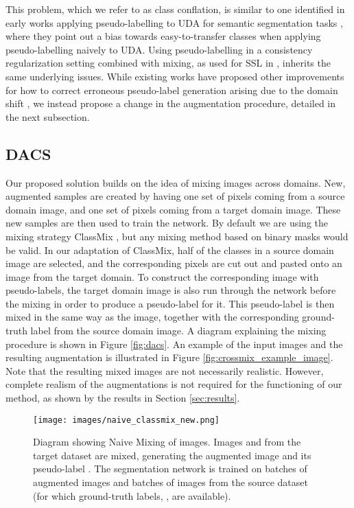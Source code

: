 \documentclass[10pt,twocolumn,letterpaper]{article}
\begin{document}
This problem, which we refer to as class conflation, is similar to one identified in early works applying pseudo-labelling to UDA for semantic segmentation tasks \cite{zou2018domain}, where they point out a bias towards easy-to-transfer classes when applying pseudo-labelling naively to UDA. 
Using pseudo-labelling in a consistency regularization setting combined with mixing, as used for SSL in \cite{ClassMix}, inherits the same underlying issues.
While existing works have proposed other improvements for how to correct erroneous pseudo-label generation arising due to the domain shift \cite{zou2018domain,zou2019confidence,zheng2020rectifying}, we instead propose a change in the augmentation procedure, detailed in the next subsection.

\subsection{DACS}
\label{sec:DACS}
Our proposed solution builds on the idea of mixing images across domains. New, augmented samples are created by having one set of pixels coming from a source domain image, and one set of pixels coming from a target domain image. These new samples are then used to train the network. By default we are using the mixing strategy ClassMix \cite{ClassMix}, but any mixing method based on binary masks would be valid. In our adaptation of ClassMix, half of the classes in a source domain image are selected, and the corresponding pixels are cut out and pasted onto an image from the target domain. To construct the corresponding image with pseudo-labels, the target domain image is also run through the network before the mixing in order to produce a pseudo-label for it. This pseudo-label is then mixed in the same way as the image, together with the corresponding ground-truth label from the source domain image. A diagram explaining the mixing procedure is shown in Figure \ref{fig:dacs}.
An example of the input images and the resulting augmentation is illustrated in Figure \ref{fig:crossmix_example_image}. Note that the resulting mixed images are not necessarily realistic. However, complete realism of the augmentations is not required for the functioning of our method, as shown by the results in Section \ref{sec:results}.



\begin{figure}[t]
    \centering
    \texttt{[image: images/naive\_classmix\_new.png]}
    \caption{Diagram showing Naive Mixing of images. Images  and  from the target dataset  are mixed, generating the augmented image  and its pseudo-label . The segmentation network is trained on batches of augmented images and batches of images from the source dataset  (for which ground-truth labels, , are available).}
    \label{fig:naive_classmix}
\end{figure}
\end{document}
